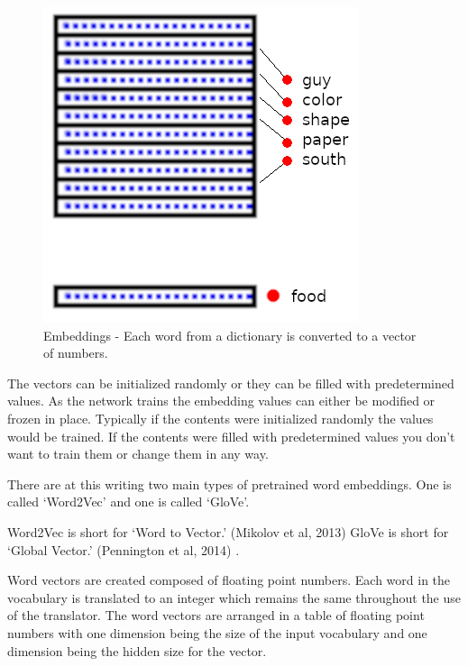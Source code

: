 \begin{figure}[H]
	\begin{center}
		\includegraphics[scale=0.5]{diagram-embedding}
		
		
	\end{center}
	\caption[Word Embeddings]{Embeddings - Each word from a dictionary is converted to a vector of numbers.}
	
\end{figure}

The vectors can be initialized randomly or they can be filled with predetermined values. As the network trains the embedding values can either be modified or frozen in place. Typically if the contents were initialized randomly the values would be trained. If the contents were filled with predetermined values you don\textquoteright t want to train them or change them in any way. 

There are at this writing two main types of pretrained word embeddings. One is called \textquoteleft Word2Vec\textquoteright{} and one is called \textquoteleft GloVe\textquoteright . 

Word2Vec is short for \textquoteleft Word to Vector.\textquoteright{} (Mikolov et al, 2013)\cite{mikolov2013efficient} GloVe is short for \textquoteleft Global Vector.\textquoteright{} (Pennington et al, 2014)\cite{pennington-etal-2014-glove} .

Word vectors are created composed of floating point numbers. Each word in the vocabulary is translated to an integer which remains the same throughout the use of the translator. The word vectors are arranged in a table of floating point numbers with one dimension being the size of the input vocabulary and one dimension being the hidden size for the vector.


